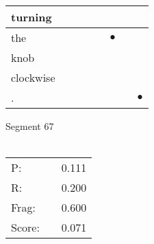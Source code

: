 \documentclass[landscape]{article}
\newcommand{\ssp}{\hspace{2pt}}
\newcommand{\mex}{\cellcolor{g}$\bullet$}
\begin{document}
\begin{tabular}{|l|p{10pt}|p{10pt}|p{10pt}|p{10pt}|p{10pt}|p{10pt}|p{10pt}|}
\hline
\ssp turning \ssp&\hspace{2pt}&\hspace{2pt}&\hspace{2pt}&\hspace{2pt}&\hspace{2pt}&\hspace{2pt}&\hspace{2pt}\\
\hline
\ssp \cellcolor{ref4}the \ssp&\hspace{2pt}&\hspace{2pt}&\hspace{2pt}&\hspace{2pt}&\hspace{2pt}\mex&\hspace{2pt}&\hspace{2pt}\\
\hline
\ssp knob \ssp&\hspace{2pt}&\hspace{2pt}&\hspace{2pt}&\hspace{2pt}&\hspace{2pt}&\hspace{2pt}&\hspace{2pt}\\
\hline
\ssp clockwise \ssp&\hspace{2pt}&\hspace{2pt}&\hspace{2pt}&\hspace{2pt}&\hspace{2pt}&\hspace{2pt}&\hspace{2pt}\\
\hline
\ssp \cellcolor{ref6}. \ssp&\hspace{2pt}&\hspace{2pt}&\hspace{2pt}&\hspace{2pt}&\hspace{2pt}&\hspace{2pt}&\hspace{2pt}\mex\\
\hline
\end{tabular}

\vspace{6pt}
\noindent Segment 67\\\\
\noindent\begin{tabular}{lm{12pt}r}
\hline
P:&&0.111\\
R:&&0.200\\
Frag:&&0.600\\
Score:&&0.071\\
\end{tabular}
\end{document}
